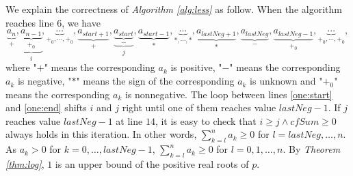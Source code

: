 We explain the correctness of {\em Algorithm \ref{alg:less}} as follow. When the algorithm reaches line $6$, we have \[\underbrace{a_n}_{+},\underbrace{\underbrace{a_{n-1}}_{+_0}}_{i},\underbrace{\cdots}_{+_0,\cdots,+_0},\underbrace{a_{start+1}}_{+},\underbrace{\underbrace{a_{start}}_{-}}_{j},\underbrace{a_{start-1}}_{*},\underbrace{\cdots}_{*,\cdots,*},\underbrace{a_{lastNeg+1}}_{*},\underbrace{a_{lastNeg}}_{-},\underbrace{a_{lastNeg-1}}_{+_0},\underbrace{\cdots}_{+_0,\cdots,+_0},\]
where "$+$" means the corresponding $a_k$ is positive, "$-$" means the corresponding $a_k$ is negative, "$*$" means the sign of the
corresponding $a_k$ is unknown and  "$+_0$" means the corresponding $a_k$ is nonnegative.
The loop between lines \ref{one:start} and \ref{one:end} shifts $i$ and $j$ right until one of them reaches value $lastNeg-1$. If $j$ reaches value $lastNeg-1$ at line $14$,  it is easy to check that $i\ge j\wedge cfSum\ge 0$ always holds in this iteration. In other words, $\sum_{k=l}^na_k\ge 0$ for $l=lastNeg,\ldots,n$. As $a_{k}>0$ for $k=0,\ldots, lastNeg-1$, $\sum_{k=l}^na_k\ge 0$ for $l=0,1,\ldots, n$. By {\em Theorem  \ref{thm:log}},  $1$ is an upper bound of the positive real roots of $p$.


